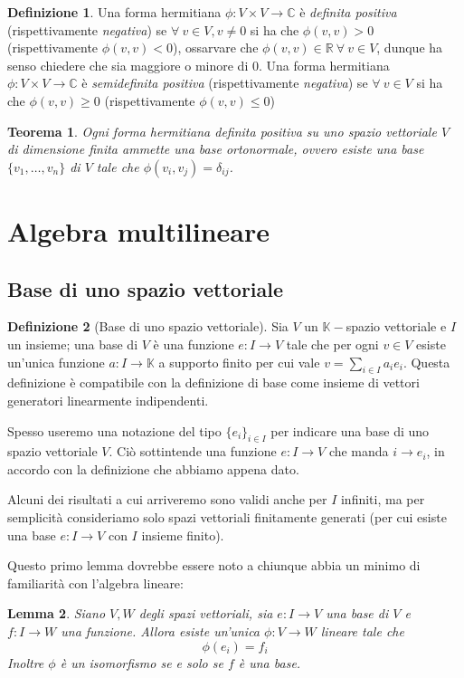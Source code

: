 \documentclass[11pt]{article}
\theoremstyle{plain}
\newtheorem{thm}{Teorema}[section]
\newtheorem{lemma}[thm]{Lemma}
\theoremstyle{definition}
\newtheorem{defn}{Definizione}[section]
\theoremstyle{remark}
\newcommand{\C}{\mathbb{C}}
\newcommand{\R}{\mathbb{R}}
\newcommand{\K}{\mathbb{K}}
\begin{document}
\begin{defn}
	Una forma hermitiana $\phi:V\times V\to \C$ è \textit{definita positiva} (rispettivamente \textit{negativa}) se $\forall\ v\in V, v\neq 0$ si ha che $\phi(v,v)>0$ (rispettivamente $\phi(v,v)<0$), ossarvare che $\phi(v,v)\in \R\ \forall\ v\in V$, dunque ha senso chiedere che sia maggiore o minore di $0$.\newline
	Una forma hermitiana $\phi:V\times V\to \C$ è \textit{semidefinita positiva} (rispettivamente \textit{negativa}) se $\forall\ v\in V$ si ha che $\phi(v,v)\geq 0$ (rispettivamente $\phi(v,v)\leq 0$)
\end{defn}

\begin{thm}
	Ogni forma hermitiana definita positiva su uno spazio vettoriale $V$ di dimensione finita ammette una \textit{base ortonormale}, ovvero esiste una base $\{v_1,\ldots,v_n\}$ di $V$ tale che $\phi(v_i,v_j)=\delta_{ij}$.
\end{thm}




\newpage
\section{Algebra multilineare}
\subsection{Base di uno spazio vettoriale}

\begin{defn}[Base di uno spazio vettoriale]
Sia $V$ un $\K-$spazio vettoriale e $I$ un insieme; una base di $V$ è una funzione $e: I \to V$ tale che
per ogni $v \in V$ esiste un'unica funzione $a: I \to \K$ a supporto finito per cui vale $v=\sum_{i\in I}a_i e_i$.
Questa definizione è compatibile con la definizione di base come insieme di vettori generatori linearmente indipendenti.

Spesso useremo una notazione del tipo $\{e_i\}_{i\in I}$ per indicare una base di uno spazio vettoriale $V$. Ciò sottintende
una funzione $e:I\to V$ che manda $i\to e_i$, in accordo con la definizione che abbiamo appena dato.
\end{defn}

Alcuni dei risultati a cui arriveremo sono validi anche per $I$ infiniti, ma per semplicità consideriamo solo
spazi vettoriali finitamente generati (per cui esiste una base $e: I \to V$ con $I$ insieme finito).

Questo primo lemma dovrebbe essere noto a chiunque abbia un minimo di familiarità con l'algebra lineare:
\begin{lemma}
Siano $V,W$ degli spazi vettoriali, sia $e:I\to V$ una base di $V$ e $f: I \to W$ una funzione. Allora esiste un'unica $\phi: V \to W$ lineare tale che
\[\phi(e_i) = f_i \]
Inoltre $\phi$ è un isomorfismo se e solo se $f$ è una base.
\end{lemma}
\end{document}
